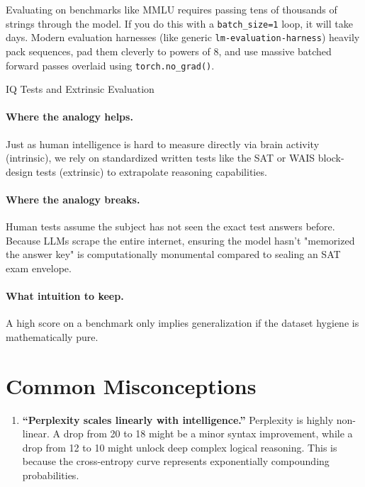 Evaluating on benchmarks like MMLU requires passing tens of thousands of strings through the model. If you do this with a \texttt{batch\_size=1} loop, it will take days. Modern evaluation harnesses (like generic \texttt{lm-evaluation-harness}) heavily pack sequences, pad them cleverly to powers of 8, and use massive batched forward passes overlaid using \texttt{torch.no\_grad()}. 

\begin{analogybox}{IQ Tests and Extrinsic Evaluation}
  \paragraph{Where the analogy helps.}
  Just as human intelligence is hard to measure directly via brain activity (intrinsic), we rely on standardized written tests like the SAT or WAIS block-design tests (extrinsic) to extrapolate reasoning capabilities.

  \paragraph{Where the analogy breaks.}
  Human tests assume the subject has not seen the exact test answers before. Because LLMs scrape the entire internet, ensuring the model hasn't "memorized the answer key" is computationally monumental compared to sealing an SAT exam envelope.

  \paragraph{What intuition to keep.}
  A high score on a benchmark only implies generalization if the dataset hygiene is mathematically pure.
\end{analogybox}


\section{Common Misconceptions}
\label{ch:13:sec:misconceptions}

\begin{enumerate}
  \item \textbf{``Perplexity scales linearly with intelligence.''} Perplexity is highly non-linear. A drop from 20 to 18 might be a minor syntax improvement, while a drop from 12 to 10 might unlock deep complex logical reasoning. This is because the cross-entropy curve represents exponentially compounding probabilities.
\end{enumerate}


